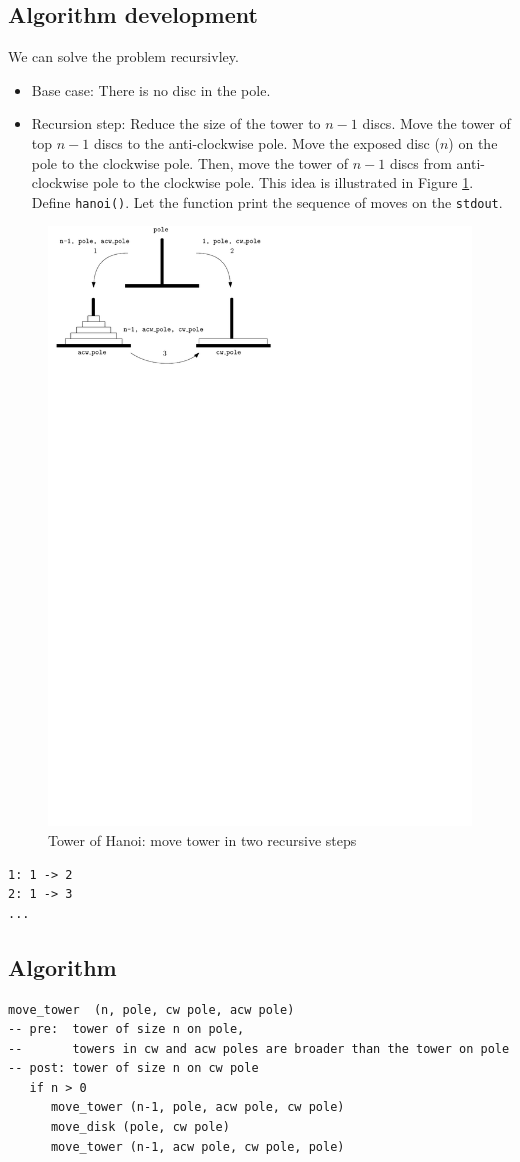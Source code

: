 \documentclass[11pt]{article}
\begin{document}
\subsection*{Algorithm development}
\label{sec-2-2}
We can solve the problem recursivley.
\begin{itemize}
\item Base case: There is no disc in the pole.
\item Recursion step: Reduce the size of the tower to $n-1$
discs. Move the tower of top $n-1$ discs to the
anti-clockwise pole. Move the exposed disc ($n$) on the
pole to the clockwise pole. Then, move the tower of $n-1$
discs from anti-clockwise pole to the clockwise pole. This
idea is illustrated in Figure \ref{fig:hanoi5}. Define
\texttt{hanoi()}. Let the function print the sequence of moves on
the \texttt{stdout}.
\end{itemize}
\begin{figure}[htb]
\centering
\includegraphics[width=.5\textwidth]{./hanoi5.pdf}
\caption{\label{fig:hanoi5}Tower of Hanoi: move tower in two recursive steps}
\end{figure}
\begin{verbatim}
1: 1 -> 2
2: 1 -> 3
...
\end{verbatim}
\subsection*{Algorithm}
\label{sec-2-3}
\linespread{1}
\begin{verbatim}
move_tower  (n, pole, cw pole, acw pole)
-- pre:  tower of size n on pole, 
--       towers in cw and acw poles are broader than the tower on pole
-- post: tower of size n on cw pole
   if n > 0
      move_tower (n-1, pole, acw pole, cw pole)
      move_disk (pole, cw pole)
      move_tower (n-1, acw pole, cw pole, pole)
\end{verbatim}
\end{document}
